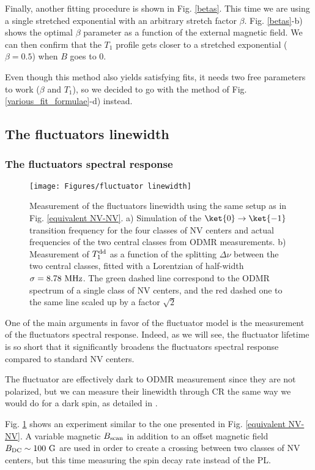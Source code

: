 \documentclass[a4paper,11pt]{report}
\begin{document}
Finally, another fitting procedure is shown in Fig. \ref{betas}. This time we are using a single stretched exponential with an arbitrary stretch factor $\beta$. Fig. \ref{betas}-b) shows the optimal $\beta$ parameter as a function of the external magnetic field. We can then confirm that the $T_1$ profile gets closer to a stretched exponential ($\beta=0.5$) when $B$ goes to 0. 

Even though this method also yields satisfying fits, it needs two free parameters to work ($\beta$ and $T_1$), so we decided to go with the method of Fig. \ref{various_fit_formulae}-d) instead.

\subsection{The fluctuators linewidth}

\subsubsection{The fluctuators spectral response}
\begin{figure}[h]
\centering
\texttt{[image: Figures/fluctuator linewidth]}
\caption{Measurement of the fluctuators linewidth using the same setup as in Fig. \ref{equivalent NV-NV}. a) Simulation of the $\ket{0} \to \ket{-1}$ transition frequency for the four classes of NV centers and actual frequencies of the two central classes from ODMR measurements. b) Measurement of $T_1^{\rm dd}$ as a function of the splitting $\Delta \nu$ between the two central classes, fitted with a Lorentzian of half-width $\sigma=8.78\ \rm MHz$. The green dashed line correspond to the ODMR spectrum of a single class of NV centers, and the red dashed one to the same line scaled up by a factor $\sqrt{2}$}
\label{fluct linewidth}
\end{figure}



One of the main arguments in favor of the fluctuator model is the measurement of the fluctuators spectral response. Indeed, as we will see, the fluctuator lifetime is so short that it significantly broadens the fluctuators spectral response compared to standard NV centers.

The fluctuator are effectively dark to ODMR measurement since they are not polarized, but we can measure their linewidth through CR the same way we would do for a dark spin, as detailed in \citep{hall2016detection}.

Fig. \ref{fluct linewidth} shows an experiment similar to the one presented in Fig. \ref{equivalent NV-NV}. A variable magnetic $B_{\rm scan}$ in addition to an offset magnetic field $B_{\rm DC} \sim 100\ \rm G$ are used in order to create a crossing between two classes of NV centers, but this time measuring the spin decay rate instead of the PL.
\end{document}
